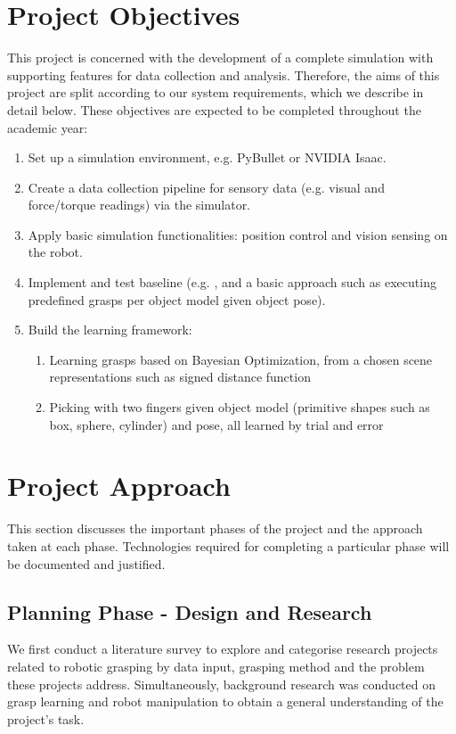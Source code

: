 \documentclass[11pt, a4paper]{report}
\begin{document}
\newpage
\section{Project Objectives}
\label{sec:1.3}
This project is concerned with the development of a complete simulation with supporting features for data collection and analysis. Therefore, the aims of this project are split according to our system requirements, which we describe in detail below. These objectives are expected to be completed throughout the academic year:
\begin{enumerate}
    \item Set up a simulation environment, e.g. PyBullet \cite{coumans2021} or NVIDIA Isaac. 
    \item Create a data collection pipeline for sensory data (e.g. visual and force/torque readings) via the simulator.
    \item Apply basic simulation functionalities: position control and vision sensing on the robot.
    \item Implement and test baseline (e.g. \cite{breyer2020volumetric}, and a basic approach such as executing predefined grasps per object model given object pose).
    \item Build the learning framework:
    \begin{enumerate}
        \item Learning grasps based on Bayesian Optimization, from a chosen scene representations such as signed distance function 
        \item Picking with two fingers given object model (primitive shapes such as box, sphere, cylinder) and pose, all learned by trial and error
    \end{enumerate}
\end{enumerate}


\section{Project Approach}
\label{sec:1.4}
This section discusses the important phases of the project and the approach taken at each phase. Technologies required for completing a particular phase will be documented and justified.


\subsection{Planning Phase - Design and Research}
\label{sec:1.4.1}
We first conduct a literature survey to explore and categorise research projects related to robotic grasping by data input, grasping method and the problem these projects address. Simultaneously, background research was conducted on grasp learning \cite{platt2022grasp} and robot manipulation to obtain a general understanding of the project's task.
\end{document}
